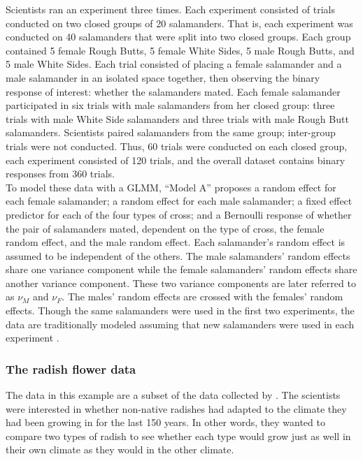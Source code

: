 \documentclass[article]{jss}
\begin{document}
Scientists ran an experiment three times. Each experiment consisted of trials conducted on two closed groups of 20 salamanders. That is, each experiment was conducted on 40 salamanders that were split into two closed groups.  Each group contained 5 female Rough Butts, 5 female White Sides, 5 male Rough Butts, and 5 male White Sides.  Each trial consisted of placing a  female salamander and a  male salamander in an isolated space together, then observing the binary response of interest: whether the salamanders mated.  Each female salamander participated in six trials with male salamanders from her closed group:  three trials with male White Side salamanders and three trials with male Rough Butt salamanders. Scientists paired salamanders from the same group; inter-group trials were not conducted. Thus, 60 trials were conducted on each closed group, each experiment consisted of 120 trials, and the overall dataset contains binary responses from 360 trials. \\


 To model these data with a GLMM,  ``Model A'' \citep{karim:zeger:1992} proposes
a random effect for each female salamander; a random effect for each male salamander; a fixed effect predictor for each of the four types of cross; and a Bernoulli response of whether the pair of salamanders mated, dependent on the type of cross, the female random effect, and the male random effect. 
 Each salamander's random effect is assumed to be independent of the others.  The male salamanders' random effects share one variance component  while the female salamanders' random effects share another variance component. These two variance components are later referred to as $\nu_M$ and $\nu_F$. The males' random effects are crossed with the females' random effects. Though the same salamanders were used in the first two experiments, the data are traditionally modeled assuming that new salamanders were used in each experiment \citep{booth:hobert:1999,  karim:zeger:1992,  mcc:nelder:1989}.\\

\subsubsection{The radish flower data}

The data in this example are a subset of the data collected by \citet{ridley:ellstrand:2010}. The scientists were interested in whether non-native radishes had adapted to the climate they had been growing in for the last 150 years. In other words, they wanted to compare two types of radish to see whether each type would grow just as well in their own climate as they would in the other climate. 
\end{document}
